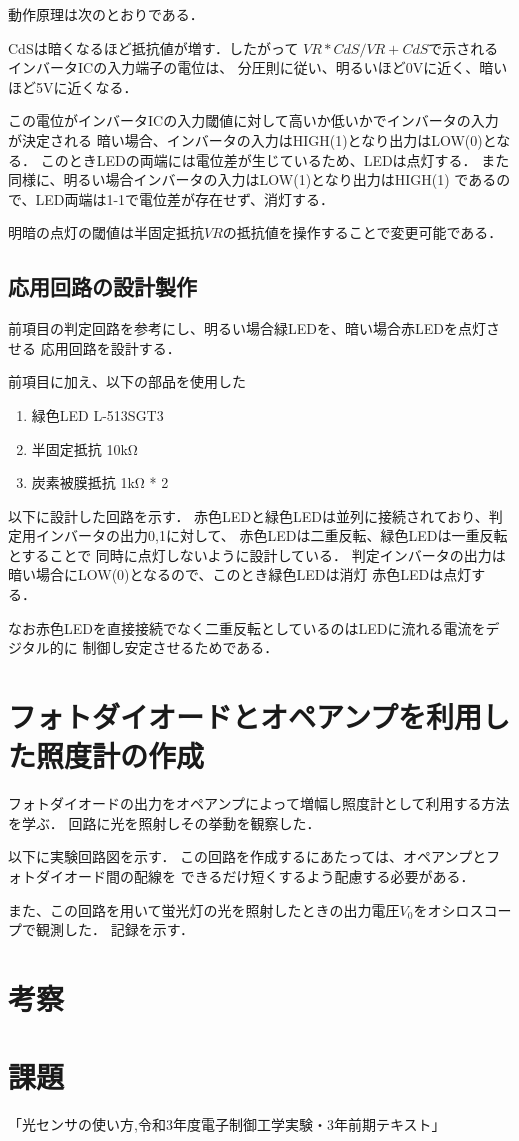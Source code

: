 \documentclass[titlepage]{jarticle}
\begin{document}
動作原理は次のとおりである．

CdSは暗くなるほど抵抗値が増す．したがって
$VR*CdS/VR+CdS$で示されるインバータICの入力端子の電位は、
分圧則に従い、明るいほど0Vに近く、暗いほど5Vに近くなる．

この電位がインバータICの入力閾値に対して高いか低いかでインバータの入力が決定される
暗い場合、インバータの入力はHIGH(1)となり出力はLOW(0)となる．
このときLEDの両端には電位差が生じているため、LEDは点灯する．
また同様に、明るい場合インバータの入力はLOW(1)となり出力はHIGH(1)
であるので、LED両端は1-1で電位差が存在せず、消灯する．

明暗の点灯の閾値は半固定抵抗$VR$の抵抗値を操作することで変更可能である．

\subsection{応用回路の設計製作}
前項目の判定回路を参考にし、明るい場合緑LEDを、暗い場合赤LEDを点灯させる
応用回路を設計する．

前項目に加え、以下の部品を使用した
\begin{enumerate}
    \item 緑色LED L-513SGT3
    \item 半固定抵抗 10kΩ
    \item 炭素被膜抵抗 1kΩ * 2
\end{enumerate}

以下に設計した回路を示す．
赤色LEDと緑色LEDは並列に接続されており、判定用インバータの出力0,1に対して、
赤色LEDは二重反転、緑色LEDは一重反転とすることで
同時に点灯しないように設計している．
判定インバータの出力は暗い場合にLOW(0)となるので、このとき緑色LEDは消灯
赤色LEDは点灯する．

なお赤色LEDを直接接続でなく二重反転としているのはLEDに流れる電流をデジタル的に
制御し安定させるためである．

\section{フォトダイオードとオペアンプを利用した照度計の作成}
フォトダイオードの出力をオペアンプによって増幅し照度計として利用する方法を学ぶ．
回路に光を照射しその挙動を観察した．

以下に実験回路図を示す．
この回路を作成するにあたっては、オペアンプとフォトダイオード間の配線を
できるだけ短くするよう配慮する必要がある．

また、この回路を用いて蛍光灯の光を照射したときの出力電圧$V_0$をオシロスコープで観測した．
記録を示す．

\section{考察}

\section{課題}

\begin{thebibliography}{99}
    \bibitem{}「光センサの使い方,令和3年度電子制御工学実験・3年前期テキスト」
\end{thebibliography}
\end{document}
